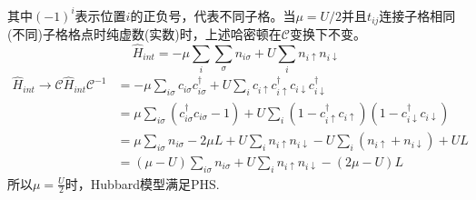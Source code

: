 \documentclass{article}
\numberwithin{equation}{subsection}
\newcommand{\mC}{\mathcal{C}}
\begin{document}
其中$(-1)^i$表示位置$i$的正负号，代表不同子格。当$\mu=U/2$并且$t_{ij}$连接子格相同(不同)子格格点时纯虚数(实数)时，上述哈密顿在$\mC$变换下不变。
\begin{equation*}
    \hat{H}_{int}=-\mu\sum_i\sum_\sigma n_{i\sigma}+U\sum_{i}n_{i\uparrow}n_{i\downarrow}
\end{equation*}
\begin{equation*}
    \begin{split}
        \hat{H}_{int}\rightarrow\mC\hat{H}_{int}\mC^{-1}&=-\mu\sum_{i\sigma}c_{i\sigma}c_{i\sigma}^\dagger+U\sum_{i}c_{i\uparrow}c_{i\uparrow}^\dagger c_{i\downarrow}c_{i\downarrow}^\dagger\\
        &=\mu\sum_{i\sigma}(c_{i\sigma}^\dagger c_{i\sigma}-1)+U\sum_{i}(1-c_{i\uparrow}^\dagger c_{i\uparrow})(1-c_{i\downarrow}^\dagger c_{i\downarrow})\\
        &=\mu\sum_{i\sigma}n_{i\sigma}-2\mu L+U\sum_{i}n_{i\uparrow}n_{i\downarrow}-U\sum_{i}(n_{i\uparrow}+n_{i\downarrow})+UL\\
        &=(\mu-U)\sum_{i\sigma}n_{i\sigma}+U\sum_{i}n_{i\uparrow}n_{i\downarrow}-(2\mu-U)L
    \end{split}
\end{equation*}
所以$\mu=\frac{U}{2}$时，Hubbard模型满足PHS.
\end{document}
